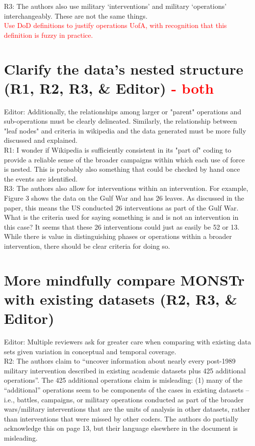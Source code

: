 \documentclass[fleqn,12pt]{article}
\begin{document}
\noindent
R3: The authors also use military ‘interventions’ and military ‘operations’ interchangeably. These are not the same things. \\

\textcolor{red}{Use DoD definitions to justify operations UofA, with recognition that this definition is fuzzy in practice.}

\section{Clarify the data's nested structure (R1, R2, R3, \& Editor) \textcolor{red}{- both}}
Editor: Additionally, the relationships among larger or "parent" operations and sub-operations must be clearly delineated.  Similarly, the relationship between "leaf nodes" and criteria in wikipedia and the data generated must be more fully discussed and explained. \\

\noindent 
R1: I wonder if Wikipedia is sufficiently consistent in its "part of" coding to provide a reliable sense of the broader campaigns within which each use of force is nested. This is probably also something that could be checked by hand once the events are identified. \\

\noindent
R3: The authors also allow for interventions within an intervention. For example, Figure 3 shows the data on the Gulf War and has 26 leaves. As discussed in the paper, this means the US conducted 26 interventions as part of the Gulf War. What is the criteria used for saying something is and is not an intervention in this case? It seems that these 26 interventions could just as easily be 52 or 13. While there is value in distinguishing phases or operations within a broader intervention, there should be clear criteria for doing so. \\

\section{More mindfully compare MONSTr with existing datasets (R2, R3, \& Editor)}
Editor: Multiple reviewers ask for greater care when comparing with existing data sets given variation in conceptual and temporal coverage. \\

\noindent 
R2: The authors claim to “uncover information about nearly every post-1989 military intervention described in existing academic datasets plus 425 additional operations”.  The 425 additional operations claim is misleading: (1) many of the “additional” operations seem to be components of the cases in existing datasets – i.e., battles, campaigns, or military operations conducted as part of the broader wars/military interventions that are the units of analysis in other datasets, rather than interventions that were missed by other coders. The authors do partially acknowledge this on page 13, but their language elsewhere in the document is misleading. \\
\end{document}
